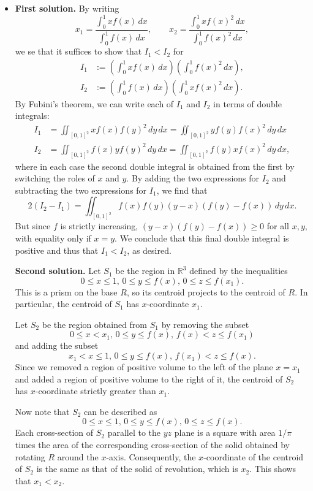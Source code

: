 \documentclass[amssymb,twocolumn,pra,10pt,aps]{revtex4-1}
\newcommand{\RR}{\mathbb{R}}
\begin{document}
\begin{itemize}
\item[B2]
\noindent
\textbf{First solution.}
By writing
\[
x_1 = \frac{\int_0^1 xf(x)\,dx}{\int_0^1 f(x)\,dx}, \qquad
x_2 = \frac{\int_0^1 xf(x)^2\,dx}{\int_0^1 f(x)^2\,dx},
\]
we se that it suffices to show that $I_1<I_2$ for
\begin{align*}
I_1 &:= \left(\int_0^1 xf(x)\,dx\right)\left(\int_0^1 f(x)^2\,dx\right), \\
I_2 &:= \left(\int_0^1 f(x)\,dx\right)\left(\int_0^1 xf(x)^2\,dx\right).
\end{align*}
By Fubini's theorem, we can write each of $I_1$ and $I_2$ in terms of double integrals:
\begin{align*} I_1 &= \iint_{[0,1]^2} xf(x)f(y)^2\,dy\,dx = \iint_{[0,1]^2} yf(y)f(x)^2\,dy\,dx \\
I_2  &=\iint_{[0,1]^2} f(x)yf(y)^2\,dy\,dx = \iint_{[0,1]^2} f(y)xf(x)^2\,dy\,dx,
\end{align*}
where in each case the second double integral is obtained from the first by switching the roles of $x$ and $y$. By adding the two expressions for $I_2$ and subtracting the two expressions for $I_1$, we find that
\[
2(I_2-I_1) = \iint_{[0,1]^2} f(x)f(y)(y-x)(f(y)-f(x))\,dy\,dx.
\]
But since $f$ is strictly increasing, $(y-x)(f(y)-f(x)) \geq 0$ for all $x,y$, with equality only if $x=y$. We conclude that this final double integral is positive and thus that $I_1<I_2$, as desired.

\noindent
\textbf{Second solution.}
Let $S_1$ be the region in $\RR^3$ defined by the inequalities
\[
0 \leq x \leq 1, \, 0 \leq y \leq f(x), \, 0 \leq z \leq f(x_1).
\]
This is a prism on the base $R$, so its centroid projects to the centroid of $R$.
In particular, the centroid of $S_1$ has $x$-coordinate $x_1$.

Let $S_2$ be the region obtained from $S_1$ by removing the subset
\[
0 \leq x < x_1, \, 0 \leq y \leq f(x), \, f(x) < z \leq f(x_1)
\]
and adding the subset
\[
x_1 < x \leq 1, \, 0 \leq y \leq f(x), \, f(x_1) < z \leq f(x).
\]
Since we removed a region of positive volume to the left of the plane $x=x_1$ and added a region of positive volume to the right of it,
the centroid of $S_2$ has $x$-coordinate strictly greater than $x_1$.

Now note that $S_2$ can be described as
\[
0 \leq x \leq 1, \, 0 \leq y \leq f(x), \, 0 \leq z \leq f(x).
\]
Each cross-section of $S_2$ parallel to the $yz$ plane is a square with area $1/\pi$ times the area
of the corresponding cross-section of the solid obtained by rotating $R$ around the $x$-axis.
Consequently, the $x$-coordinate of the centroid of $S_2$ is the same as that of the solid of revolution, which is $x_2$. This shows that $x_1 < x_2$.


\end{itemize}
\end{document}
